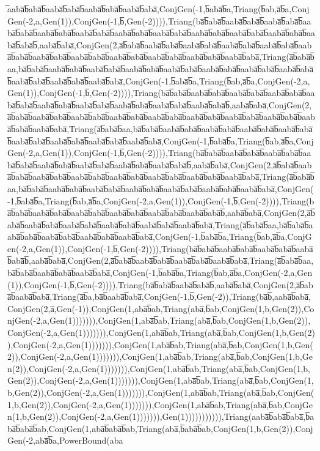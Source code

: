 ̅aaba̅b̅aba̅b̅aaba̅b̅aba̅b̅aaba̅b̅aba̅b̅aaba̅b̅aba̅,ConjGen(-1,b̅aba̅b̅a,Triang(b̅ab,a̅b̅a,ConjGen(-2,a,Gen(1)),ConjGen(-1,b̅,Gen(-2)))),Triang(ba̅b̅aba̅b̅aaba̅b̅aba̅b̅aaba̅b̅aba̅b̅aaba̅b̅aba̅b̅aaba̅b̅aba̅b̅aaba̅b̅aba̅b̅aaba̅b̅aba̅b̅aaba̅b̅aba̅b̅aaba̅b̅aba̅b̅aaba̅b̅aba̅b̅aaba̅b̅aba̅b̅aaba̅b̅aba̅b̅,aaba̅b̅aba̅,ConjGen(2,a̅b̅aba̅b̅aaba̅b̅aba̅b̅aaba̅b̅aba̅b̅aaba̅b̅aba̅b̅aaba̅b̅aba̅b̅aaba̅b̅aba̅b̅aaba̅b̅aba̅b̅aaba̅b̅aba̅b̅aaba̅b̅aba̅b̅aaba̅b̅aba̅b̅aaba̅b̅aba̅b̅aaba̅b̅aba̅,Triang(a̅b̅aba̅b̅aa,ba̅b̅aba̅b̅aaba̅b̅aba̅b̅aaba̅b̅aba̅b̅aaba̅b̅aba̅b̅aaba̅b̅aba̅b̅aaba̅b̅aba̅b̅aaba̅b̅aba̅b̅aaba̅b̅aba̅b̅aaba̅b̅aba̅b̅aaba̅b̅aba̅b̅aaba̅b̅aba̅,ConjGen(-1,b̅aba̅b̅a,Triang(b̅ab,a̅b̅a,ConjGen(-2,a,Gen(1)),ConjGen(-1,b̅,Gen(-2)))),Triang(ba̅b̅aba̅b̅aaba̅b̅aba̅b̅aaba̅b̅aba̅b̅aaba̅b̅aba̅b̅aaba̅b̅aba̅b̅aaba̅b̅aba̅b̅aaba̅b̅aba̅b̅aaba̅b̅aba̅b̅aaba̅b̅aba̅b̅aaba̅b̅aba̅b̅,aaba̅b̅aba̅,ConjGen(2,a̅b̅aba̅b̅aaba̅b̅aba̅b̅aaba̅b̅aba̅b̅aaba̅b̅aba̅b̅aaba̅b̅aba̅b̅aaba̅b̅aba̅b̅aaba̅b̅aba̅b̅aaba̅b̅aba̅b̅aaba̅b̅aba̅b̅aaba̅b̅aba̅,Triang(a̅b̅aba̅b̅aa,ba̅b̅aba̅b̅aaba̅b̅aba̅b̅aaba̅b̅aba̅b̅aaba̅b̅aba̅b̅aaba̅b̅aba̅b̅aaba̅b̅aba̅b̅aaba̅b̅aba̅b̅aaba̅b̅aba̅b̅aaba̅b̅aba̅,ConjGen(-1,b̅aba̅b̅a,Triang(b̅ab,a̅b̅a,ConjGen(-2,a,Gen(1)),ConjGen(-1,b̅,Gen(-2)))),Triang(ba̅b̅aba̅b̅aaba̅b̅aba̅b̅aaba̅b̅aba̅b̅aaba̅b̅aba̅b̅aaba̅b̅aba̅b̅aaba̅b̅aba̅b̅aaba̅b̅aba̅b̅aaba̅b̅aba̅b̅,aaba̅b̅aba̅,ConjGen(2,a̅b̅aba̅b̅aaba̅b̅aba̅b̅aaba̅b̅aba̅b̅aaba̅b̅aba̅b̅aaba̅b̅aba̅b̅aaba̅b̅aba̅b̅aaba̅b̅aba̅b̅aaba̅b̅aba̅,Triang(a̅b̅aba̅b̅aa,ba̅b̅aba̅b̅aaba̅b̅aba̅b̅aaba̅b̅aba̅b̅aaba̅b̅aba̅b̅aaba̅b̅aba̅b̅aaba̅b̅aba̅b̅aaba̅b̅aba̅,ConjGen(-1,b̅aba̅b̅a,Triang(b̅ab,a̅b̅a,ConjGen(-2,a,Gen(1)),ConjGen(-1,b̅,Gen(-2)))),Triang(ba̅b̅aba̅b̅aaba̅b̅aba̅b̅aaba̅b̅aba̅b̅aaba̅b̅aba̅b̅aaba̅b̅aba̅b̅aaba̅b̅aba̅b̅,aaba̅b̅aba̅,ConjGen(2,a̅b̅aba̅b̅aaba̅b̅aba̅b̅aaba̅b̅aba̅b̅aaba̅b̅aba̅b̅aaba̅b̅aba̅b̅aaba̅b̅aba̅,Triang(a̅b̅aba̅b̅aa,ba̅b̅aba̅b̅aaba̅b̅aba̅b̅aaba̅b̅aba̅b̅aaba̅b̅aba̅b̅aaba̅b̅aba̅,ConjGen(-1,b̅aba̅b̅a,Triang(b̅ab,a̅b̅a,ConjGen(-2,a,Gen(1)),ConjGen(-1,b̅,Gen(-2)))),Triang(ba̅b̅aba̅b̅aaba̅b̅aba̅b̅aaba̅b̅aba̅b̅aaba̅b̅aba̅b̅,aaba̅b̅aba̅,ConjGen(2,a̅b̅aba̅b̅aaba̅b̅aba̅b̅aaba̅b̅aba̅b̅aaba̅b̅aba̅,Triang(a̅b̅aba̅b̅aa,ba̅b̅aba̅b̅aaba̅b̅aba̅b̅aaba̅b̅aba̅,ConjGen(-1,b̅aba̅b̅a,Triang(b̅ab,a̅b̅a,ConjGen(-2,a,Gen(1)),ConjGen(-1,b̅,Gen(-2)))),Triang(ba̅b̅aba̅b̅aaba̅b̅aba̅b̅,aaba̅b̅aba̅,ConjGen(2,a̅b̅aba̅b̅aaba̅b̅aba̅,Triang(a̅b̅a,ba̅b̅aaba̅b̅aba̅,ConjGen(-1,b̅,Gen(-2)),Triang(ba̅b̅,aaba̅b̅aba̅,ConjGen(2,a̅,Gen(-1)),ConjGen(1,aba̅b̅ab,Triang(aba̅,b̅ab,ConjGen(1,b,Gen(2)),ConjGen(-2,a,Gen(1))))))),ConjGen(1,aba̅b̅ab,Triang(aba̅,b̅ab,ConjGen(1,b,Gen(2)),ConjGen(-2,a,Gen(1))))))),ConjGen(1,aba̅b̅ab,Triang(aba̅,b̅ab,ConjGen(1,b,Gen(2)),ConjGen(-2,a,Gen(1))))))),ConjGen(1,aba̅b̅ab,Triang(aba̅,b̅ab,ConjGen(1,b,Gen(2)),ConjGen(-2,a,Gen(1))))))),ConjGen(1,aba̅b̅ab,Triang(aba̅,b̅ab,ConjGen(1,b,Gen(2)),ConjGen(-2,a,Gen(1))))))),ConjGen(1,aba̅b̅ab,Triang(aba̅,b̅ab,ConjGen(1,b,Gen(2)),ConjGen(-2,a,Gen(1))))))),ConjGen(1,aba̅b̅ab,Triang(aba̅,b̅ab,ConjGen(1,b,Gen(2)),ConjGen(-2,a,Gen(1))))))),ConjGen(1,aba̅b̅ab,Triang(aba̅,b̅ab,ConjGen(1,b,Gen(2)),ConjGen(-2,a,Gen(1))))))),ConjGen(1,aba̅b̅ab,Triang(aba̅,b̅ab,ConjGen(1,b,Gen(2)),ConjGen(-2,a,Gen(1))))))),Gen(1))))))))))),Triang(aaba̅b̅aba̅b̅aba̅,b̅aba̅b̅aba̅b̅ab,ConjGen(1,aba̅b̅aba̅b̅ab,Triang(aba̅,b̅aba̅b̅ab,ConjGen(1,b,Gen(2)),ConjGen(-2,aba̅b̅a,PowerBound(aba